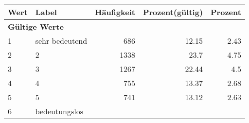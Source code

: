      \begin{longtable}{lXrrr}
     \toprule
     \textbf{Wert} & \textbf{Label} & \textbf{Häufigkeit} & \textbf{Prozent(gültig)} & \textbf{Prozent} \\
     \endhead
     \midrule
     \multicolumn{5}{l}{\textbf{Gültige Werte}}\\

     1 &
     \multicolumn{1}{X}{ sehr bedeutend   } &


       \num{686} &
       \num[round-mode=places,round-precision=2]{12,15} &
         \num[round-mode=places,round-precision=2]{2,43} \\

     2 &
     \multicolumn{1}{X}{ 2   } &


       \num{1338} &
       \num[round-mode=places,round-precision=2]{23,7} &
         \num[round-mode=places,round-precision=2]{4,75} \\

     3 &
     \multicolumn{1}{X}{ 3   } &


       \num{1267} &
       \num[round-mode=places,round-precision=2]{22,44} &
         \num[round-mode=places,round-precision=2]{4,5} \\

     4 &
     \multicolumn{1}{X}{ 4   } &


       \num{755} &
       \num[round-mode=places,round-precision=2]{13,37} &
         \num[round-mode=places,round-precision=2]{2,68} \\

     5 &
     \multicolumn{1}{X}{ 5   } &


       \num{741} &
       \num[round-mode=places,round-precision=2]{13,12} &
         \num[round-mode=places,round-precision=2]{2,63} \\

     6 &
     \multicolumn{1}{X}{ bedeutungslos   } &



\end{longtable}
